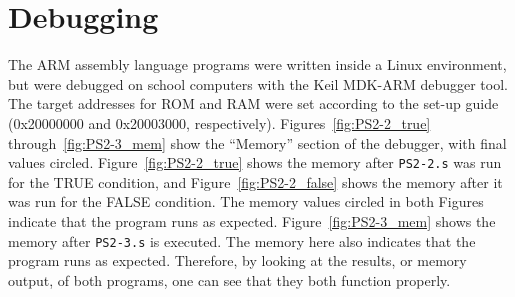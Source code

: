 \documentclass{article}
\begin{document}
\newpage
\section*{ Debugging }
The ARM assembly language programs were written inside a Linux environment, but were debugged on school computers with the Keil MDK-ARM debugger tool. The target addresses for ROM and RAM were set according to the set-up guide (0x20000000 and 0x20003000, respectively). Figures~\ref{fig:PS2-2_true} through~\ref{fig:PS2-3_mem} show the ``Memory'' section of the debugger, with final values circled. Figure~\ref{fig:PS2-2_true} shows the memory after \texttt{PS2-2.s} was run for the TRUE condition, and Figure~\ref{fig:PS2-2_false} shows the memory after it was run for the FALSE condition. The memory values circled in both Figures indicate that the program runs as expected.  Figure~\ref{fig:PS2-3_mem} shows the memory after \texttt{PS2-3.s} is executed. The memory here also indicates that the program runs as expected. Therefore, by looking at the results, or memory output, of both programs, one can see that they both function properly. 
\end{document}
